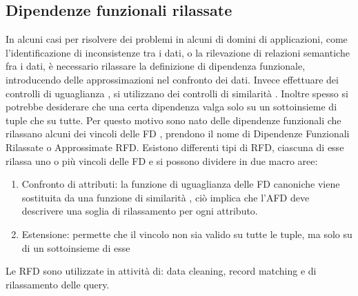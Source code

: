\subsection{Dipendenze funzionali rilassate}
In alcuni casi per risolvere dei problemi in alcuni di domini di applicazioni, come l’identificazione di inconsistenze tra i dati, o la rilevazione di relazioni semantiche fra i dati,  è necessario rilassare la definizione di dipendenza funzionale, introducendo delle approssimazioni nel confronto dei dati. Invece effettuare dei controlli di uguaglianza , si utilizzano dei controlli di similarità .
Inoltre spesso si potrebbe desiderare che una certa dipendenza valga solo su un sottoinsieme di tuple che su tutte.
Per questo motivo sono nato delle dipendenze funzionali che rilassano alcuni dei vincoli delle FD , prendono il nome di Dipendenze Funzionali Rilassate o Approssimate RFD.
Esistono differenti tipi di RFD, ciascuna di esse rilassa uno o più vincoli delle FD e si possono dividere in due macro aree:
\begin{enumerate}
    \item Confronto di attributi: la funzione di uguaglianza delle FD canoniche viene sostituita da una funzione di similarità , ciò implica che l'AFD deve descrivere una soglia di rilassamento per ogni attributo.
    \item Estensione: permette che il vincolo non sia valido su tutte le tuple, ma solo su di un sottoinsieme di esse
\end{enumerate}


Le RFD sono utilizzate in attività di:
data cleaning, record matching e di rilassamento delle query.

